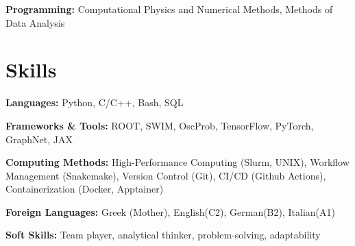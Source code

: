 \documentclass[letterpaper,11pt]{article}
\begin{document}
{{{        \textbf{Programming:}{ Computational Physics and Numerical Methods, Methods of Data Analysis}
    }}
  \resumeSubHeadingListEnd


\section{Skills}
  \vspace{2pt}
  \resumeSubHeadingListStart
    \small{\item{
        
        \textbf{Languages:}{ Python, C/C++, Bash, SQL} \\ \vspace{3pt}

        \textbf{Frameworks \& Tools:}{ ROOT, SWIM, OscProb, TensorFlow, PyTorch, GraphNet, JAX} 
        
        \textbf{Computing Methods:}{ High-Performance Computing (Slurm, UNIX), Workflow Management (Snakemake), Version Control (Git), CI/CD (Github Actions), Containerization (Docker, Apptainer)} \\ \vspace{3pt}
        


        \textbf{Foreign Languages:} {Greek (Mother), English(C2), German(B2), Italian(A1)} \\ \vspace{3pt}

        \textbf{Soft Skills:}{ Team player, analytical thinker, problem-solving, adaptability} \\ \vspace{3pt}
    }}
  \resumeSubHeadingListEnd




      
}
\end{document}
